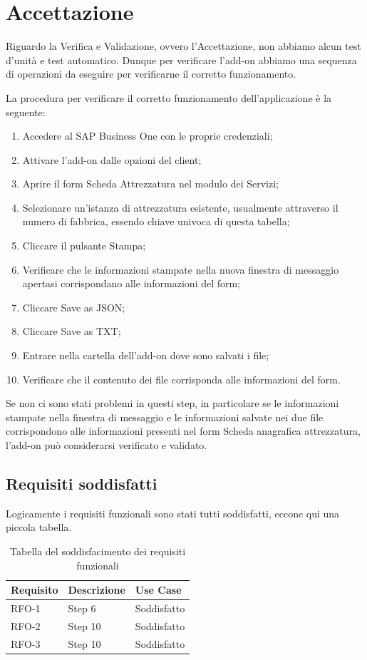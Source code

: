 \section{Accettazione}


Riguardo la Verifica e Validazione, ovvero l'Accettazione, non abbiamo alcun test d'unità e test automatico.
Dunque per verificare l'add-on abbiamo una sequenza di operazioni da eseguire per verificarne il corretto funzionamento.
\vspace{1em}


La procedura per verificare il corretto funzionamento dell'applicazione è la seguente:



\begin{enumerate}
	\item Accedere al SAP Business One con le proprie credenziali;
	\item Attivare l'add-on dalle opzioni del client;
	\item Aprire il form Scheda Attrezzatura nel modulo dei Servizi;
	\item Selezionare un'istanza di attrezzatura esistente, usualmente attraverso il numero di fabbrica, essendo chiave univoca di questa tabella;
	\item Cliccare il pulsante Stampa;
	\item Verificare che le informazioni stampate nella nuova finestra di messaggio apertasi corrispondano alle informazioni del form;
	\item Cliccare Save as JSON;
	\item Cliccare Save as TXT;
	\item Entrare nella cartella dell'add-on dove sono salvati i file;
	\item Verificare che il contenuto dei file corrisponda alle informazioni del form.
\end{enumerate}

Se non ci sono stati problemi in questi step, in particolare se le informazioni stampate nella finestra di messaggio e le informazioni salvate nei due file corrispondono alle informazioni presenti nel form Scheda anagrafica attrezzatura, l'add-on può considerarsi verificato e validato.

\subsection{Requisiti soddisfatti}
Logicamente i requisiti funzionali sono stati tutti soddisfatti, eccone qui una piccola tabella.

\begin{table}[!h]%
	\begin{tabularx}{\textwidth}{lXl}
		\hline\hline
		\textbf{Requisito} & \textbf{Descrizione} & \textbf{Use Case}\\
		\hline
		RFO-1     & Step 6 & Soddisfatto \\
		RFO-2     & Step 10 & Soddisfatto\\
		RFO-3     & Step 10 & Soddisfatto\\
		\hline
	\end{tabularx}
	\caption{Tabella del soddisfacimento dei requisiti funzionali}
	\label{tab:requisiti-funzionali-soddisfatti}
\end{table}%